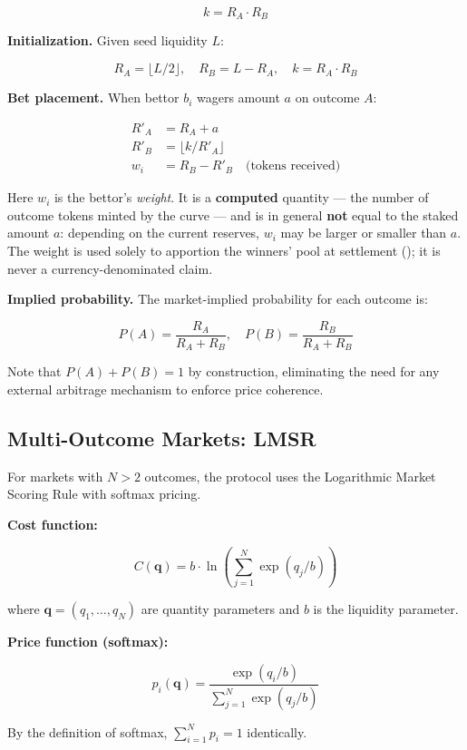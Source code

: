 \documentclass{ledger}
\theoremstyle{plain}
\theoremstyle{remark}
\begin{document}
\[
k = R_A \cdot R_B
\]

\textbf{Initialization.} Given seed liquidity $L$:

\[
R_A = \lfloor L / 2 \rfloor, \quad R_B = L - R_A, \quad k = R_A \cdot R_B
\]

\textbf{Bet placement.} When bettor $b_i$ wagers amount $a$ on outcome $A$:

\begin{align*}
R'_A &= R_A + a \\
R'_B &= \lfloor k / R'_A \rfloor \\
w_i  &= R_B - R'_B \quad \text{(tokens received)}
\end{align*}

Here $w_i$ is the bettor's \emph{weight}. It is a \textbf{computed} quantity ---
the number of outcome tokens minted by the curve --- and is in general
\textbf{not} equal to the staked amount $a$: depending on the current reserves,
$w_i$ may be larger or smaller than $a$. The weight is used solely to apportion
the winners' pool at settlement (); it is never a
currency-denominated claim.

\textbf{Implied probability.} The market-implied probability for each outcome is:

\[
P(A) = \frac{R_A}{R_A + R_B}, \quad P(B) = \frac{R_B}{R_A + R_B}
\]

Note that $P(A) + P(B) = 1$ by construction, eliminating the need for any
external arbitrage mechanism to enforce price coherence.

\subsection{Multi-Outcome Markets: LMSR}

For markets with $N > 2$ outcomes, the protocol uses the Logarithmic Market
Scoring Rule with softmax pricing.

\textbf{Cost function:}

\[
C(\mathbf{q}) = b \cdot \ln\left(\sum_{j=1}^{N} \exp(q_j / b)\right)
\]

where $\mathbf{q} = (q_1, \ldots, q_N)$ are quantity parameters and $b$ is the
liquidity parameter.

\textbf{Price function (softmax):}

\[
p_i(\mathbf{q}) = \frac{\exp(q_i / b)}{\sum_{j=1}^{N} \exp(q_j / b)}
\]

By the definition of softmax, $\sum_{i=1}^{N} p_i = 1$ identically.
\end{document}
